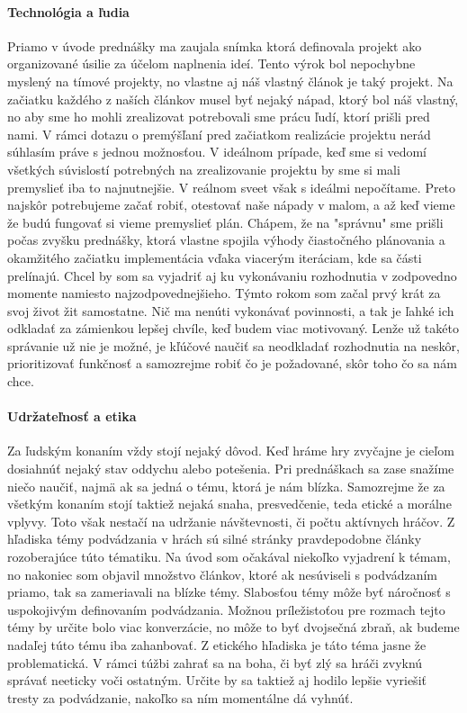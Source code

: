 \documentclass[10pt, oneside, slovak,a4paper]{article}
\begin{document}
\paragraph{Technológia a ľudia}
Priamo v úvode prednášky ma zaujala snímka ktorá definovala projekt ako organizované úsilie za účelom naplnenia ideí. Tento výrok bol nepochybne myslený na tímové projekty, no vlastne aj náš vlastný článok je taký projekt. Na začiatku každého z naších článkov musel byť nejaký nápad, ktorý bol náš vlastný, no aby sme ho mohli zrealizovat potrebovali sme prácu ľudí, ktorí prišli pred nami.
V rámci dotazu o premýšľaní pred začiatkom realizácie projektu nerád súhlasím práve s jednou možnosťou. V ideálnom prípade, keď sme si vedomí všetkých súvislostí potrebných na zrealizovanie projektu by sme si mali premyslieť iba to najnutnejšie. V reálnom sveet však s ideálmi nepočítame. Preto najskôr potrebujeme začať robiť, otestovať naše nápady v malom, a až keď vieme že budú fungovať si vieme premyslieť plán. Chápem, že na "správnu" sme prišli počas zvyšku prednášky, ktorá vlastne spojila výhody čiastočného plánovania a okamžitého začiatku implementácia vďaka viacerým iteráciam, kde sa části prelínajú.
Chcel by som sa vyjadriť aj ku vykonávaniu rozhodnutia v zodpovedno momente namiesto najzodpovednejšieho. Týmto rokom som začal prvý krát za svoj život žit samostatne. Nič ma nenúti vykonávať povinnosti, a tak je ľahké ich odkladať za zámienkou lepšej chvíle, keď budem viac motivovaný. Lenže už takéto správanie už nie je možné, je kľúčové naučiť sa neodkladať rozhodnutia na neskôr, prioritizovať funkčnosť a samozrejme robiť čo je požadované, skôr toho čo sa nám chce.

\paragraph{Udržateľnosť a etika}
Za ľudským konaním vždy stojí nejaký dôvod. Keď hráme hry zvyčajne je cieľom dosiahnúť nejaký stav oddychu alebo potešenia. Pri prednáškach sa zase snažíme niečo naučiť, najmä ak sa jedná o tému, ktorá je nám blízka. Samozrejme že za všetkým konaním stojí taktiež nejaká snaha, presvedčenie, teda etické a morálne vplyvy. Toto však nestačí na udržanie návštevnosti, či počtu aktívnych hráčov.
Z hľadiska témy podvádzania v hrách sú silné stránky pravdepodobne články rozoberajúce túto tématiku. Na úvod som očakával niekoľko vyjadrení k témam, no nakoniec som objavil množstvo článkov, ktoré ak nesúviseli s podvádzaním priamo, tak sa zameriavali na blízke témy. Slabosťou témy môže byť náročnosť s uspokojivým definovaním podvádzania. Možnou príležistoťou pre rozmach tejto témy by určite bolo viac konverzácie, no môže to byť dvojsečná zbraň, ak budeme nadaľej túto tému iba zahanbovať.
Z etického hľadiska je táto téma jasne že problematická. V rámci túžbi zahrať sa na boha, či byť zlý sa hráči zvyknú správať neeticky voči ostatným. Určite by sa taktiež aj hodilo lepšie vyriešiť tresty za podvádzanie, nakoľko sa ním momentálne dá vyhnúť.
\end{document}
